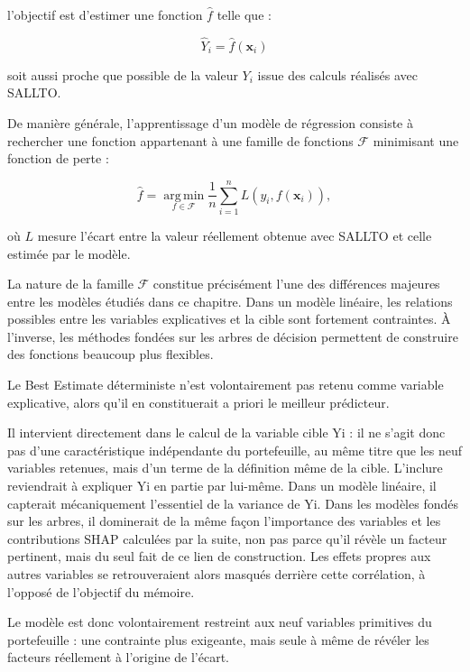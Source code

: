 l'objectif est d'estimer une fonction $\widehat{f}$ telle que :

\begin{equation}
    \widehat{Y}_i
    =
    \widehat{f}(\mathbf{x}_i)
\end{equation}

soit aussi proche que possible de la valeur $Y_i$ issue des calculs réalisés avec SALLTO.

De manière générale, l'apprentissage d'un modèle de régression consiste à rechercher une fonction appartenant à une famille de fonctions $\mathcal{F}$ minimisant une fonction de perte :

\begin{equation}
    \widehat{f}
    =
    \underset{f \in \mathcal{F}}{\operatorname{arg\,min}}
    \frac{1}{n}
    \sum_{i=1}^{n}
    L
    \left(
    y_i,
    f(\mathbf{x}_i)
    \right),
    \label{eq:empirical_risk}
\end{equation}

où $L$ mesure l'écart entre la valeur réellement obtenue avec SALLTO et celle estimée par le modèle.

La nature de la famille $\mathcal{F}$ constitue précisément l'une des différences majeures entre les modèles étudiés dans ce chapitre. Dans un modèle linéaire, les relations possibles entre les variables explicatives et la cible sont fortement contraintes. À l'inverse, les méthodes fondées sur les arbres de décision permettent de construire des fonctions beaucoup plus flexibles.

Le Best Estimate déterministe n'est volontairement pas retenu comme variable explicative, alors qu'il en constituerait a priori le meilleur prédicteur.

Il intervient directement dans le calcul de la variable cible Yi : il ne s'agit donc pas d'une caractéristique indépendante du portefeuille, au même titre que les neuf variables retenues, mais d'un terme de la définition même de la cible. L'inclure reviendrait à expliquer Yi en partie par lui-même. Dans un modèle linéaire, il capterait mécaniquement l'essentiel de la variance de Yi. Dans les modèles fondés sur les arbres, il dominerait de la même façon l'importance des variables et les contributions SHAP calculées par la suite, non pas parce qu'il révèle un facteur pertinent, mais du seul fait de ce lien de construction. Les effets propres aux autres variables se retrouveraient alors masqués derrière cette corrélation, à l'opposé de l'objectif du mémoire.

Le modèle est donc volontairement restreint aux neuf variables primitives du portefeuille : une contrainte plus exigeante, mais seule à même de révéler les facteurs réellement à l'origine de l'écart.


